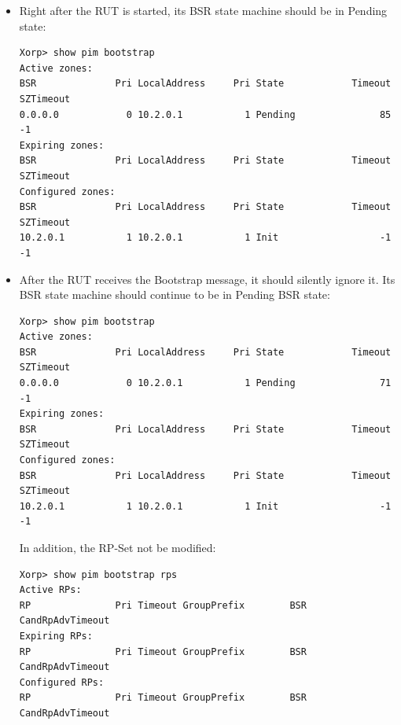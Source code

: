 \documentclass[11pt]{report}
\begin{document}

\begin{itemize}

  \item Right after the RUT is started, its BSR state machine should be in
  Pending state:

\begin{verbatim}
Xorp> show pim bootstrap 
Active zones:
BSR              Pri LocalAddress     Pri State            Timeout SZTimeout
0.0.0.0            0 10.2.0.1           1 Pending               85        -1
Expiring zones:
BSR              Pri LocalAddress     Pri State            Timeout SZTimeout
Configured zones:
BSR              Pri LocalAddress     Pri State            Timeout SZTimeout
10.2.0.1           1 10.2.0.1           1 Init                  -1        -1
\end{verbatim}

  \item After the RUT receives the Bootstrap message, it should silently
        ignore it.
        Its BSR state machine should continue to be in Pending BSR state:

\begin{verbatim}
Xorp> show pim bootstrap 
Active zones:
BSR              Pri LocalAddress     Pri State            Timeout SZTimeout
0.0.0.0            0 10.2.0.1           1 Pending               71        -1
Expiring zones:
BSR              Pri LocalAddress     Pri State            Timeout SZTimeout
Configured zones:
BSR              Pri LocalAddress     Pri State            Timeout SZTimeout
10.2.0.1           1 10.2.0.1           1 Init                  -1        -1
\end{verbatim}

  In addition, the RP-Set not be modified:

\begin{verbatim}
Xorp> show pim bootstrap rps 
Active RPs:
RP               Pri Timeout GroupPrefix        BSR         CandRpAdvTimeout
Expiring RPs:
RP               Pri Timeout GroupPrefix        BSR         CandRpAdvTimeout
Configured RPs:
RP               Pri Timeout GroupPrefix        BSR         CandRpAdvTimeout
\end{verbatim}

\end{itemize}

\end{document}
